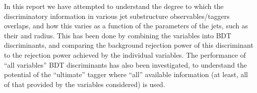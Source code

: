 In this report we have attempted to understand the degree to which the discriminatory information in various jet substructure observables/taggers overlaps, and how this varies as a function of the parameters of the jets, such as their \pt and radius. This has been done by combining the variables into BDT discriminants, and comparing the background rejection power of this discriminant to the rejection power achieved by the individual variables. The performance of ``all variables'' BDT discriminants has also been investigated, to understand the potential of the ``ultimate'' tagger where ``all'' available information (at least, all of that provided by the variables considered) is used. 


